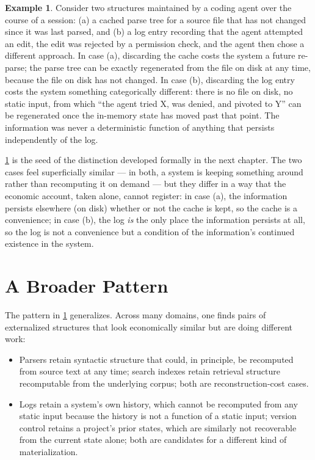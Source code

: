 \documentclass[11pt]{book}
\theoremstyle{plain}
\theoremstyle{definition}
\newtheorem{example}[theorem]{Example}
\theoremstyle{remark}
\begin{document}
\begin{example}
\label{ex:log-vs-cache}
Consider two structures maintained by a coding agent over the course
of a session: (a) a cached parse tree for a source file that has not
changed since it was last parsed, and (b) a log entry recording that
the agent attempted an edit, the edit was rejected by a permission
check, and the agent then chose a different approach. In case (a),
discarding the cache costs the system a future re-parse; the parse
tree can be exactly regenerated from the file on disk at any time,
because the file on disk has not changed. In case (b), discarding the
log entry costs the system something categorically different: there
is no file on disk, no static input, from which \enquote{the agent
tried X, was denied, and pivoted to Y} can be regenerated once the
in-memory state has moved past that point. The information was never a
deterministic function of anything that persists independently of the
log.
\end{example}

\cref{ex:log-vs-cache} is the seed of the distinction developed
formally in the next chapter. The two cases feel superficially similar
--- in both, a system is keeping something around rather than
recomputing it on demand --- but they differ in a way that the
economic account, taken alone, cannot register: in case (a), the
information persists elsewhere (on disk) whether or not the cache is
kept, so the cache is a convenience; in case (b), the log \emph{is}
the only place the information persists at all, so the log is not a
convenience but a condition of the information's continued existence
in the system.

\section{A Broader Pattern}

The pattern in \cref{ex:log-vs-cache} generalizes. Across many
domains, one finds pairs of externalized structures that look
economically similar but are doing different work:

\begin{itemize}
\item Parsers retain syntactic structure that could, in principle, be
recomputed from source text at any time; search indexes retain
retrieval structure recomputable from the underlying corpus; both are
reconstruction-cost cases.
\item Logs retain a system's own history, which cannot be recomputed
from any static input because the history is not a function of a
static input; version control retains a project's prior states, which
are similarly not recoverable from the current state alone; both are
candidates for a different kind of materialization.
\end{itemize}
\end{document}
